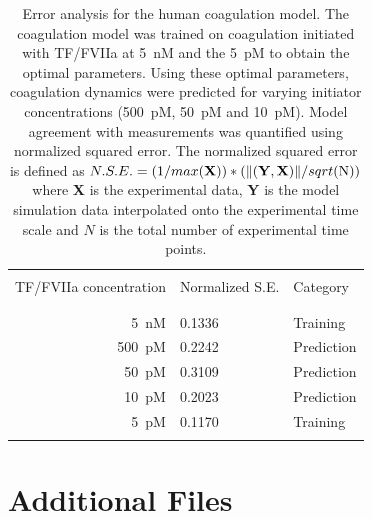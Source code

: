 \documentclass{bmcart}
\begin{document}
\begin{backmatter}
\begin{table}[h!]
\centering
\caption[.]{Error analysis for the human coagulation model. The coagulation model was trained on coagulation initiated with TF/FVIIa at 5~nM and the 5~pM to obtain the optimal parameters.
Using these optimal parameters, coagulation dynamics were predicted for varying initiator concentrations (500~pM, 50~pM and 10~pM).
Model agreement with measurements was quantified using normalized squared error. The normalized squared error is defined as \( N.S.E.=(1/max(\mathbf{X}))*(\lVert (\mathbf{Y},\mathbf{X}) \rVert /sqrt$(N)$) \) where \textbf{X} is the experimental data, \textbf{Y} is the model simulation data interpolated onto the experimental time scale and $N$ is the total number of experimental time points.}
\label{table:Error-Analysis}
\begin{center}
\begin{tabular}{ r|ll}
\hline\\
TF/FVIIa concentration& Normalized S.E.& Category\\\\
\hline\\
5~nM & 0.1336 & Training \\
500~pM & 0.2242 & Prediction\\
50~pM & 0.3109 & Prediction\\
10~pM & 0.2023 & Prediction\\
5~pM & 0.1170 & Training\\\\
\hline
\end{tabular}
\end{center}
\end{table}

\clearpage

\section*{Additional Files}
\setcounter{equation}{0}
\setcounter{table}{0}
\setcounter{figure}{0}
%

\end{backmatter}
\end{document}
